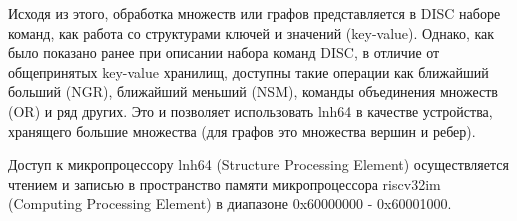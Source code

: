 Исходя из этого, обработка множеств или графов представляется в DISC наборе команд, как работа со структурами ключей и значений (key-value). Однако, как было показано ранее при описании набора команд DISC, в отличие от общепринятых key-value хранилищ, доступны такие операции как ближайший больший (NGR), ближайший меньший (NSM), команды объединения множеств (OR) и ряд других. Это и позволяет использовать lnh64 в качестве устройства, хранящего большие множества (для графов это множества вершин и ребер).

Доступ к микропроцессору lnh64 (Structure Processing Element) осуществляется чтением и записью в пространство памяти микропроцессора riscv32im (Computing Processing Element) в диапазоне 0x60000000 - 0x60001000.
\newpage